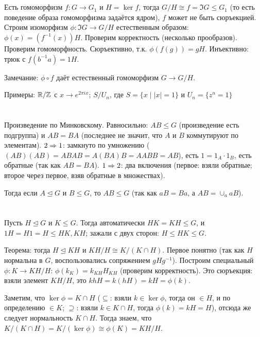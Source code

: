 \section{} %
Есть гомоморфизм $f \colon G \to G_1$ и $H=\ker f$, тогда $G/H \cong f = \Im G \le G_1$
(то есть поведение образа гомоморфизма задаётся ядром), $f$ может не быть сюръекцией.
Строим изоморфизм $\phi \colon \Im G \to G / H$ естественным образом: $\phi(x)=(f^{-1}(x))H$.
Проверим корректность (несколько прообразов).
Проверим гомоморфность.
Сюръективно, т.к. $\phi(f(g))=gH$.
Инъективно: трюк с $f(b^{-1}a)=1H$.

Замечание: $\phi \circ f$ даёт естественный гомоморфизм $G \to G/H$.

Примеры: $\mathbb{R}/\mathbb{Z}$ с $x\to e^{2\pi ix}$; $S/U_n$, где $S=\{x\mid |x|=1\}$ и $U_n=\{z^n=1\}$

\section{} %
Произведение по Минковскому.
Равносильно: $AB \le G$ (произведение есть подгруппа) и $AB=BA$ (последнее не значит, что $A$ и $B$ коммутируют по элементам).
$2 \Rightarrow 1$: замкнуто по умножению ($(AB)(AB)=ABAB=A(BA)B=AABB=AB$),
есть $1=1_A\cdot 1_B$, есть обратные (так как $AB=BA$).
$1 \Rightarrow 2$: два включения (первое: взяли обратные; второе через первое, взяв обратные в множествах).

Тогда если $A \unlhd G$ и $B \le G$, то $AB \le G$ (так как $aB=Ba$, а $AB=\cup_a aB$).

\section{} %
Пусть $H \unlhd G$ и $K \le G$.
Тогда автоматически $HK=KH \le G$, и $1H=H1=H\le HK, KH$;
зажали с двух сторон: $H \le HK \le G$.

Теорема: тогда $H \unlhd KH$ и $KH / H \cong K / (K \cap H)$.
Первое понятно (так как $H$ нормальна в $G$, воспользовались сопряжением $gHg^{-1}$).
Построим специальный $\phi \colon K \to KH / H$: $\phi(k_{K})=k_{KH}H_{KH}$ (проверим корректность).
Это сюръекция: взяли элемент $KH/H$, это $khH=k(hH)=kH=\phi(k)$.

Заметим, что $\ker \phi=K \cap H$ ($\subseteq$: взяли $k \in \ker \phi$, тогда
он $\in H$, и по определению $\in K$; $\supseteq$: взяли $k \in K \cap H$,
тогда $\phi(k)=kH=H$), отсюда же следует нормальность $K\cap H$.
Тогда знаем, что $K/(K\cap H) = K/(\ker \phi) \cong \phi(K) = KH / H$.

